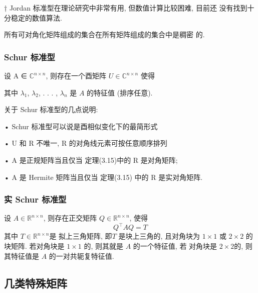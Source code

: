 \documentclass[12pt,a4paper]{article}
\begin{document}
† Jordan 标准型在理论研究中非常有用, 但数值计算比较困难, 目前还
没有找到十分稳定的数值算法.



\begin{corollary}
	所有可对角化矩阵组成的集合在所有矩阵组成的集合中是稠密
	的.
\end{corollary}


\newpage
\subsubsection{Schur 标准型}

\begin{theorem}
	设 A ∈ $\mathbb{C}^{n×n}$, 则存在一个酉矩阵 $U ∈\mathbb{C}^{n×n}$ 使得	
	
	其中 $\lambda_1$, $\lambda_2$, . . . , $\lambda_n$ 是 $A$ 的特征值 (排序任意).
\end{theorem}


关于 Schur 标准型的几点说明:

• Schur 标准型可以说是酉相似变化下的最简形式

• U 和 R 不唯一, R 的对角线元素可按任意顺序排列

• A 是正规矩阵当且仅当 定理(3.15)中的 R 是对角矩阵;

• A 是 Hermite 矩阵当且仅当 定理(3.15) 中的 R 是实对角矩阵.

\subsubsection{实 Schur 标准型}

\begin{theorem}
	设 $A ∈ \mathbb{R}^{n×n}$, 则存在正交矩阵 $Q ∈ \mathbb{R}^{n×n}$, 使得
	$$
	Q^{\top} A Q=T
	$$
	其中 $T ∈ \mathbb{R}^{n×n}$是 拟上三角矩阵, 即$ T$ 是块上三角的, 且对角块为 $1 × 1$
	或 $2 × 2$ 的块矩阵. 若对角块是 $1 × 1$ 的, 则其就是 $A$ 的一个特征值, 若
	对角块是 $2 × 2 $的, 则其特征值是 $A$ 的一对共轭复特征值.
\end{theorem}


\subsection{几类特殊矩阵}
\end{document}
